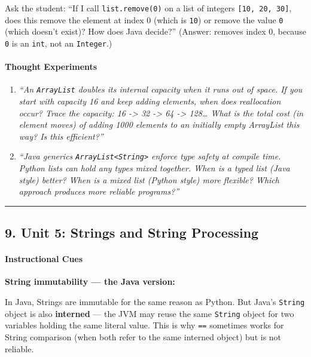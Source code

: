 \documentclass[
  justified,
  openright,
]{tufte-book}
\let\paragraph\paragraph
\let\paragraph\paragraph
\begin{document}
Ask the student: ``If I call \texttt{list.remove(0)} on a list of
integers \texttt{{[}10,\ 20,\ 30{]}}, does this remove the element at
index 0 (which is \texttt{10}) or remove the value \texttt{0} (which
doesn't exist)? How does Java decide?'' (Answer: removes index 0,
because \texttt{0} is an \texttt{int}, not an \texttt{Integer}.)

\paragraph{Thought Experiments}\label{thought-experiments-6}

\begin{enumerate}
\def\labelenumi{\arabic{enumi}.}
\item
  \emph{``An \texttt{ArrayList} doubles its internal capacity when it
  runs out of space. If you start with capacity 16 and keep adding
  elements, when does reallocation occur? Trace the capacity: 16
  -\textgreater{} 32 -\textgreater{} 64 -\textgreater{} 128\ldots{} What
  is the total cost (in element moves) of adding 1000 elements to an
  initially empty ArrayList this way? Is this efficient?''}
\item
  \emph{``Java generics
  \texttt{ArrayList\textless{}String\textgreater{}} enforce type safety
  at compile time. Python lists can hold any types mixed together. When
  is a typed list (Java style) better? When is a mixed list (Python
  style) more flexible? Which approach produces more reliable
  programs?''}
\end{enumerate}

\begin{center}\rule{0.5\linewidth}{0.5pt}\end{center}

\subsection{9. Unit 5: Strings and String
Processing}\label{unit-5-strings-and-string-processing}

\paragraph{Instructional Cues}\label{instructional-cues-7}

\textbf{String immutability --- the Java version:}

In Java, Strings are immutable for the same reason as Python. But Java's
\texttt{String} object is also \textbf{interned} --- the JVM may reuse
the same \texttt{String} object for two variables holding the same
literal value. This is why \texttt{==} sometimes works for String
comparison (when both refer to the same interned object) but is not
reliable.
\end{document}
